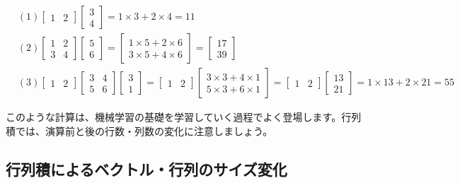 \[
\begin{aligned}
&\left( 1\right)
\begin{bmatrix}
1 & 2
\end{bmatrix}\begin{bmatrix}
3 \\
4
\end{bmatrix} = 1\times 3 + 2 \times 4 = 11\\
&\left( 2\right)
\begin{bmatrix}
1 & 2 \\
3 & 4
\end{bmatrix}\begin{bmatrix}
5 \\
6
\end{bmatrix} = \begin{bmatrix}
1 \times 5 + 2 \times 6 \\
3 \times 5 + 4 \times 6
\end{bmatrix} = \begin{bmatrix}
17 \\
39
\end{bmatrix}\\
&\left( 3\right)
\begin{bmatrix}
1 & 2
\end{bmatrix}\begin{bmatrix}
3 & 4 \\
5 & 6
\end{bmatrix}\begin{bmatrix}
3 \\
1
\end{bmatrix}
=\begin{bmatrix}
1 & 2
\end{bmatrix}\begin{bmatrix}
3 \times 3 + 4 \times 1 \\
5 \times 3 + 6 \times 1
\end{bmatrix} = \begin{bmatrix}
1 & 2
\end{bmatrix}\begin{bmatrix}
13 \\
21
\end{bmatrix}
= 1 \times 13 + 2 \times 21
=55
\end{aligned}
\]


このような計算は、機械学習の基礎を学習していく過程でよく登場します。行列積では、演算前と後の行数・列数の変化に注意しましょう。


\subsection{行列積によるベクトル・行列のサイズ変化}


